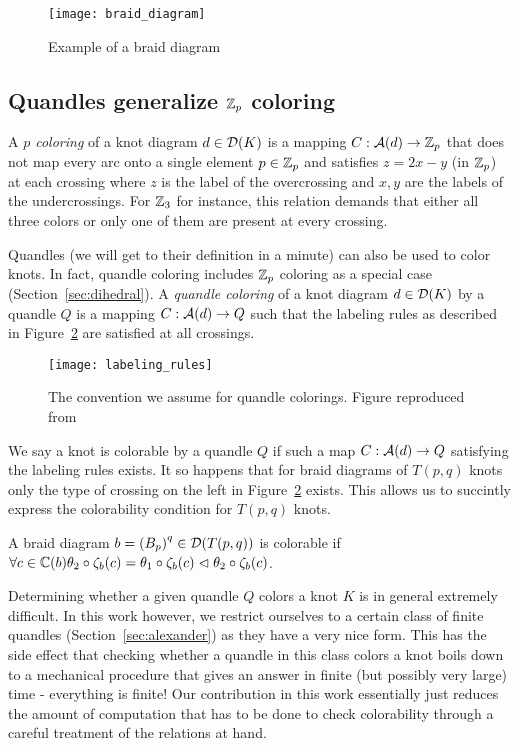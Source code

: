 \documentclass[paper.tex]{subfiles}
\begin{document}
\begin{figure}[h]
  \centering
  \texttt{[image: braid\_diagram]}
  \caption{Example of a braid diagram}\label{fig:braid_diagram}
\end{figure}

\subsection{Quandles generalize $\mathbb{Z}_p$ coloring}

A \emph{$p$ coloring} of a knot diagram $d \in \operatorname{\mathcal{D}}(K)$ is a mapping $C: \mathcal{A}(d) \to \mathbb{Z}_p$ that does not map every arc onto a single element $p \in \mathbb{Z}_p$ and satisfies $z = 2x - y$ (in $\mathbb{Z}_p$) at each crossing where
$z$ is the label of the overcrossing and $x,y$ are the labels of the undercrossings. For $\mathbb{Z}_3$ for instance, this relation demands that either all three colors or only one of them are present at every crossing.

Quandles (we will get to their definition in a minute) can also be used to color knots. In fact, quandle coloring includes $\mathbb{Z}_p$ coloring as a special case (Section~\ref{sec:dihedral}). A \emph{quandle coloring} of a knot diagram
$d \in \operatorname{\mathcal{D}}(K)$ by a quandle $Q$ is a mapping $C: \mathcal{A}(d) \to Q$ such that the labeling rules as described in Figure~\ref{fig:labeling_rules} are satisfied at all crossings.

\begin{figure}[H]
  \centering
  \texttt{[image: labeling\_rules]}
  \caption{The convention we assume for quandle colorings. Figure reproduced from~\cite{Cusick}}\label{fig:labeling_rules}
\end{figure}


We say a knot is colorable by a quandle $Q$ if such a map $C: \mathcal{A}(d) \to Q$ satisfying the labeling rules exists. It so happens that for braid diagrams of $T(p,q)$ knots only the type of crossing on the left in
Figure~\ref{fig:labeling_rules} exists. This allows us to succintly express the colorability condition for $T(p,q)$ knots.

A braid diagram $b = {(B_p)}^q \in \operatorname{\mathcal{D}}(T(p,q))$ is colorable if $\forall c \in  \mathbb{C}(b) \theta_2 \circ \zeta_b(c) = \theta_1 \circ \zeta_b(c) \vartriangleleft \theta_2 \circ \zeta_b(c)$.

Determining whether a given quandle $Q$ colors a knot $K$ is in general extremely difficult. In this work however, we restrict ourselves to a certain class of finite quandles (Section~\ref{sec:alexander}) as they have a very nice
form. This has the side effect that checking whether a quandle in this class colors a knot boils down to a mechanical procedure that gives an answer in finite (but possibly very large) time - everything is finite! Our contribution
in this work essentially just reduces the amount of computation that has to be done to check colorability through a careful treatment of the relations at hand.
\end{document}

